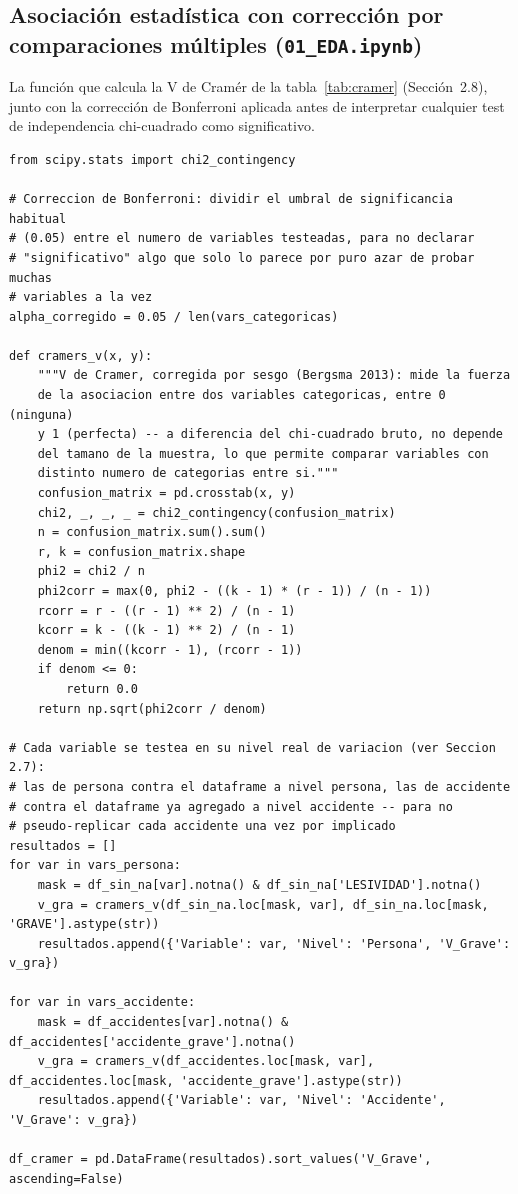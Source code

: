 \documentclass[11pt,a4paper]{article}
\begin{document}
\subsection{Asociación estadística con corrección por comparaciones múltiples (\texttt{01\_EDA.ipynb})}
\label{app:cramer}

La función que calcula la V de Cramér de la tabla~\ref{tab:cramer} (Sección~2.8), junto con la corrección de Bonferroni aplicada antes de interpretar cualquier test de independencia chi-cuadrado como significativo.

\begin{lstlisting}[caption={Cálculo de la V de Cramér y corrección de Bonferroni para comparaciones múltiples.}]
from scipy.stats import chi2_contingency

# Correccion de Bonferroni: dividir el umbral de significancia habitual
# (0.05) entre el numero de variables testeadas, para no declarar
# "significativo" algo que solo lo parece por puro azar de probar muchas
# variables a la vez
alpha_corregido = 0.05 / len(vars_categoricas)

def cramers_v(x, y):
    """V de Cramer, corregida por sesgo (Bergsma 2013): mide la fuerza
    de la asociacion entre dos variables categoricas, entre 0 (ninguna)
    y 1 (perfecta) -- a diferencia del chi-cuadrado bruto, no depende
    del tamano de la muestra, lo que permite comparar variables con
    distinto numero de categorias entre si."""
    confusion_matrix = pd.crosstab(x, y)
    chi2, _, _, _ = chi2_contingency(confusion_matrix)
    n = confusion_matrix.sum().sum()
    r, k = confusion_matrix.shape
    phi2 = chi2 / n
    phi2corr = max(0, phi2 - ((k - 1) * (r - 1)) / (n - 1))
    rcorr = r - ((r - 1) ** 2) / (n - 1)
    kcorr = k - ((k - 1) ** 2) / (n - 1)
    denom = min((kcorr - 1), (rcorr - 1))
    if denom <= 0:
        return 0.0
    return np.sqrt(phi2corr / denom)

# Cada variable se testea en su nivel real de variacion (ver Seccion 2.7):
# las de persona contra el dataframe a nivel persona, las de accidente
# contra el dataframe ya agregado a nivel accidente -- para no
# pseudo-replicar cada accidente una vez por implicado
resultados = []
for var in vars_persona:
    mask = df_sin_na[var].notna() & df_sin_na['LESIVIDAD'].notna()
    v_gra = cramers_v(df_sin_na.loc[mask, var], df_sin_na.loc[mask, 'GRAVE'].astype(str))
    resultados.append({'Variable': var, 'Nivel': 'Persona', 'V_Grave': v_gra})

for var in vars_accidente:
    mask = df_accidentes[var].notna() & df_accidentes['accidente_grave'].notna()
    v_gra = cramers_v(df_accidentes.loc[mask, var], df_accidentes.loc[mask, 'accidente_grave'].astype(str))
    resultados.append({'Variable': var, 'Nivel': 'Accidente', 'V_Grave': v_gra})

df_cramer = pd.DataFrame(resultados).sort_values('V_Grave', ascending=False)
\end{lstlisting}
\end{document}
